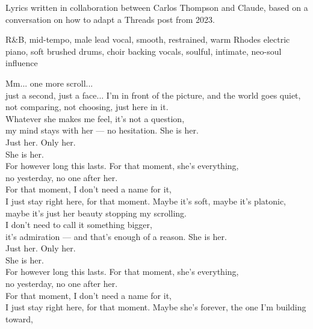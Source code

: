 
\label{sec:for-that-moment}
\begin{notes}
Lyrics written in collaboration between Carlos Thompson and Claude, based on a conversation on how to adapt a Threads post from 2023.
\end{notes}
\begin{style}
R\&B, mid-tempo, male lead vocal, smooth, restrained, warm Rhodes electric piano, soft brushed drums, choir backing vocals, soulful, intimate, neo-soul influence
\end{style}
\begin{lyrics}
Mm... one more scroll...\\
just a second, just a face...
I'm in front of the picture, and the world goes quiet,\\
not comparing, not choosing, just here in it.\\
Whatever she makes me feel, it's not a question,\\
my mind stays with her — no hesitation.
She is her.\\
Just her. Only her.\\
She is her.\\
For however long this lasts.
For that moment, she's everything,\\
no yesterday, no one after her.\\
For that moment, I don't need a name for it,\\
I just stay right here, for that moment.
Maybe it's soft, maybe it's platonic,\\
maybe it's just her beauty stopping my scrolling.\\
I don't need to call it something bigger,\\
it's admiration — and that's enough of a reason.
She is her.\\
Just her. Only her.\\
She is her.\\
For however long this lasts.
For that moment, she's everything,\\
no yesterday, no one after her.\\
For that moment, I don't need a name for it,\\
I just stay right here, for that moment.
Maybe she's forever, the one I'm building toward,\\

\end{lyrics}
